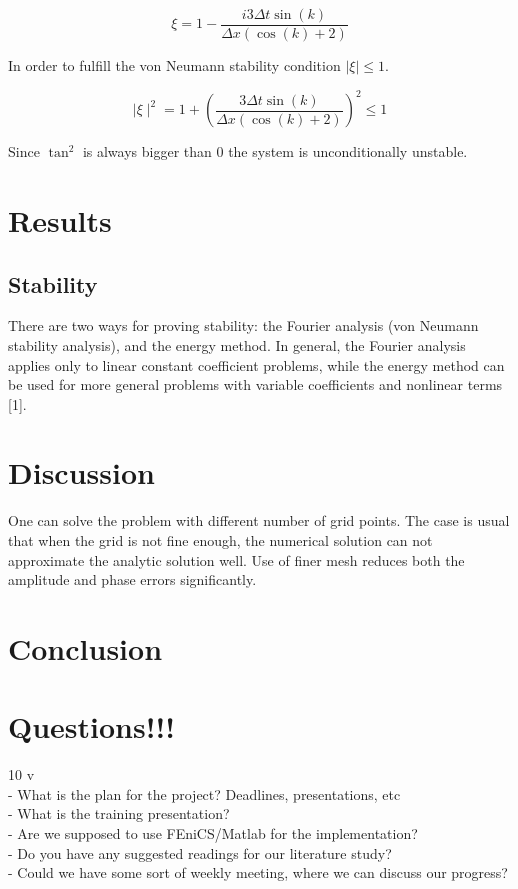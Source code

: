 \documentclass[a4paper,10pt,twoside]{article}
\begin{document}
\begin{equation}
        \xi  = 1 - \frac{i3 \Delta t \sin(k)}{\Delta x\left(\cos(k) +2\right)} 
\end{equation}

In order to fulfill the von Neumann stability condition $\mid  \xi \mid \leq 1$.

\begin{equation}
    \mid \xi \mid^2 = 1 + \left(\frac{3 \Delta t \sin(k)}{\Delta x\left(\cos(k) +2\right)}\right)^2 \leq 1
\end{equation}

Since $\tan^2$ is always bigger than 0 the system is unconditionally unstable.

\section{Results}
\subsection{Stability}
There are two ways for proving stability: the Fourier
analysis (von Neumann stability analysis), and the energy method.
In general, the Fourier analysis applies only to linear constant coefficient
problems, while the energy method can be used for more general
problems with variable coefficients and nonlinear terms [1].

\section{Discussion}
One can solve the problem with different number of grid points. The case is usual that when the grid is not fine enough, the
numerical solution can not approximate the analytic solution well. Use of
finer mesh reduces both the amplitude and phase errors significantly.





\section{Conclusion}


\section{Questions!!!}
10 v\\
- What is the plan for the project? Deadlines, presentations, etc\\
- What is the training presentation?\\
- Are we supposed to use FEniCS/Matlab for the implementation?\\
- Do you have any suggested readings for our literature study?\\
- Could we have some sort of weekly meeting, where we can discuss our progress?\\
\end{document}
